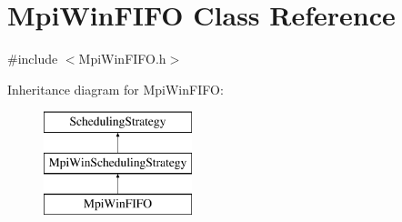 \hypertarget{class_mpi_win_f_i_f_o}{}\section{Mpi\+Win\+F\+I\+F\+O Class Reference}
\label{class_mpi_win_f_i_f_o}


{\ttfamily \#include $<$Mpi\+Win\+F\+I\+F\+O.\+h$>$}

Inheritance diagram for Mpi\+Win\+F\+I\+F\+O\+:\begin{figure}[H]
\begin{center}
\leavevmode
\includegraphics[height=3.000000cm]{class_mpi_win_f_i_f_o}
\end{center}
\end{figure}
